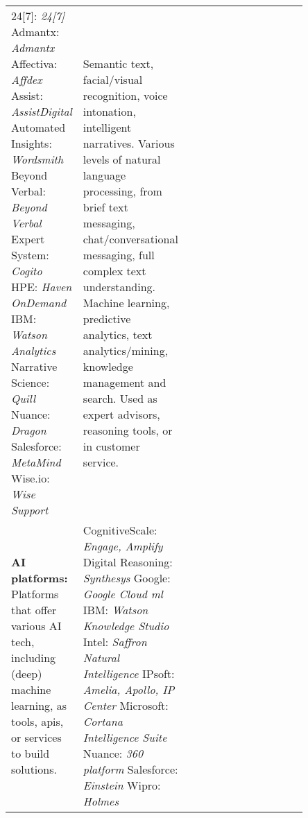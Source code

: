 \begin{landscape}
\begin{table}
{\begin{tabular}{p{0.2\linewidth}|p{0.25\linewidth}p{0.4\linewidth}}
24[7]: \textit{24[7]}\newline
Admantx: \textit{Admantx}\newline
Affectiva: \textit{Affdex}\newline
Assist: \textit{AssistDigital}\newline
Automated Insights: \textit{Wordsmith}\newline
Beyond Verbal: \textit{Beyond Verbal}\newline
Expert System: \textit{Cogito}\newline
HPE: \textit{Haven OnDemand}\newline
IBM: \textit{Watson Analytics}\newline
Narrative Science: \textit{Quill}\newline
Nuance: \textit{Dragon}\newline
Salesforce: \textit{MetaMind}\newline
Wise.io: \textit{Wise Support}\bigskip&

Semantic text, facial/visual recognition, voice intonation, intelligent narratives.\newline
Various levels of natural language processing, from brief text messaging, chat/conversational messaging, full complex text understanding.\newline
Machine learning, predictive analytics, text analytics/mining, knowledge management and search.\newline
Used as expert advisors, reasoning tools, or in customer service.\\

\textbf{AI platforms:}\newline
Platforms that offer various AI tech, including (deep) machine learning, as tools, \glspl{api}, or services to build solutions.&

CognitiveScale: \textit{Engage, Amplify}\newline
Digital Reasoning: \textit{Synthesys}\newline
Google: \textit{Google Cloud \gls{ml}}\newline
IBM: \textit{Watson Knowledge Studio}\newline
Intel: \textit{Saffron Natural Intelligence}\newline
IPsoft: \textit{Amelia, Apollo, IP Center}\newline
Microsoft: \textit{Cortana Intelligence Suite}\newline
Nuance: \textit{360 platform}\newline
Salesforce: \textit{Einstein}\newline
Wipro: \textit{Holmes}&


\end{tabular}}
\end{table}
\end{landscape}

